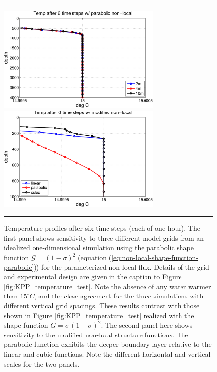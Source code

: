 \begin{figure}[h!t]
\rule{\textwidth}{0.005in}
\begin{center}
\includegraphics[angle=0,width=8cm]{./figs/KPP_temperature_parabolic_nonlocal.pdf}
\includegraphics[angle=0,width=8cm]{./figs/KPP_temperature_linear_para_cubic_nonlocal.pdf}
\caption[KPP temperature test with modified non-local]{\sf Temperature
  profiles after six time steps (each of one hour).  The first panel
  shows sensitivity to three different model grids from an idealized
  one-dimensional simulation using the parabolic shape function
  $\mathcal{G} = (1-\sigma)^{2}$ (equation
  (\ref{eq:non-local-shape-function-parabolic})) for the parameterized
  non-local flux.  Details of the grid and experimental design are
  given in the caption to Figure \ref{fig:KPP_temperature_test}.  Note
  the absence of any water warmer than $15^{\circ}C$, and the close
  agreement for the three simulations with different vertical grid
  spacings.  These results contrast with those shown in Figure
  \ref{fig:KPP_temperature_test} realized with the shape function $G =
  \sigma \, (1-\sigma)^{2}.$ The second panel here shows sensitivity
  to the modified non-local structure functions. The parabolic
  function exhibits the deeper boundary layer relative to the linear
  and cubic functions.  Note the different horizontal and vertical
  scales for the two panels.}
\label{fig:non-local-shape-compare}
\end{center}
\rule{\textwidth}{0.005in}
\end{figure}



